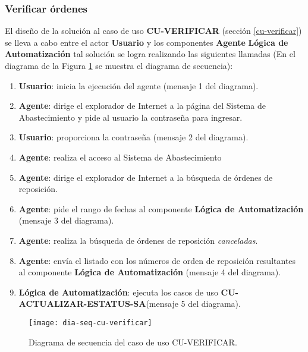 \subsubsection{Verificar órdenes}
El diseño de la solución al caso de uso \textbf{CU-VERIFICAR} (sección \ref{cu-verificar}) se lleva a cabo entre el actor \textbf{Usuario} y los componentes \textbf{Agente} \textbf{Lógica de Automatización} tal solución se logra realizando las siguientes llamadas (En el diagrama de la Figura \ref{fig:dia-seq-cu-verificar} se muestra el diagrama de secuencia):
\begin{enumerate}
	\item \textbf{Usuario}: inicia la ejecución del agente (mensaje 1 del diagrama).
	\item \textbf{Agente}: dirige el explorador de Internet a la página del Sistema de Abastecimiento y pide al usuario la contraseña para ingresar.
	\item \textbf{Usuario}: proporciona la contraseña (mensaje 2 del diagrama).
	\item \textbf{Agente}: realiza el acceso al Sistema de Abastecimiento
	\item \textbf{Agente}: dirige el explorador de Internet a la búsqueda de órdenes de reposición.
	\item \textbf{Agente}: pide el rango de fechas al componente \textbf{Lógica de Automatización} (mensaje 3 del diagrama).
	\item \textbf{Agente}: realiza la búsqueda de órdenes de reposición \textit{canceladas}.
	\item \textbf{Agente}: envía el listado con los números de orden de reposición resultantes al componente \textbf{Lógica de Automatización} (mensaje 4 del diagrama).
	\item \textbf{Lógica de Automatización}: ejecuta los casos de uso \textbf{CU-ACTUALIZAR-ESTATUS-SA}(mensaje 5 del diagrama).
\end{enumerate}

\begin{figure}[h]
	\centering
	\texttt{[image: dia-seq-cu-verificar]}
	\caption{Diagrama de secuencia del caso de uso CU-VERIFICAR.}
	\label{fig:dia-seq-cu-verificar}
\end{figure}

